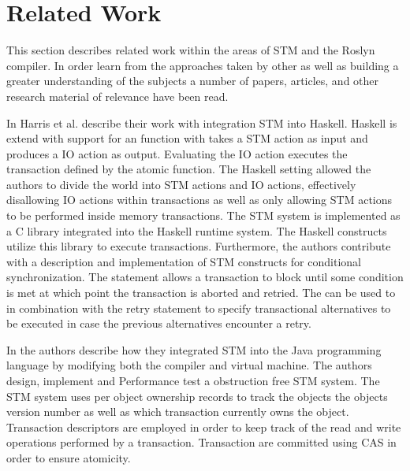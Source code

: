 \section{Related Work}
This section describes related work within the areas of \ac{STM} and the Roslyn compiler. In order learn from the approaches taken by other as well as building a greater understanding of the subjects a number of papers, articles, and other research material of relevance have been read. 

In \cite{harris2005composable} Harris et al. describe their work with integration \ac{STM} into Haskell. Haskell is extend with support for an  function with takes a \ac{STM} action as input and produces a \ac{IO} action as output\cite[p. 51]{harris2005composable}. Evaluating the IO action executes the transaction defined by the atomic function. The Haskell setting allowed the authors to divide the world into \ac{STM} actions and \ac{IO} actions\cite[p. 51]{harris2005composable}, effectively disallowing \ac{IO} actions within transactions as well as only allowing \ac{STM} actions to be performed inside memory transactions. The \ac{STM} system is implemented as a C library integrated into the Haskell runtime system. The Haskell constructs utilize this library to execute transactions\cite[p. 56]{harris2005composable}. Furthermore, the authors contribute with a description and implementation of \ac{STM} constructs for conditional synchronization. The  statement allows a transaction to block until some condition is met at which point the transaction is aborted and retried\cite[p. 52]{harris2005composable}. The  can be used to in combination with the retry statement to specify transactional alternatives to be executed in case the previous alternatives encounter a retry\cite[p. 52]{harris2005composable}.


In \cite{harris2003language} the authors describe how they integrated \ac{STM} into the Java programming language by modifying both the compiler\cite[p. 4]{harris2003language} and virtual machine\cite[p. 9]{harris2003language}. The authors design, implement and Performance test a obstruction free \ac{STM} system. The \ac{STM} system uses per object ownership records to track the objects the objects version number as well as which transaction currently owns the object\cite[p. 6]{harris2003language}. Transaction descriptors are employed in order to keep track of the read and write operations performed by a transaction.
Transaction are committed  using \ac{CAS} in order to ensure atomicity\cite[p. 7]{harris2003language}.


\worksheetend